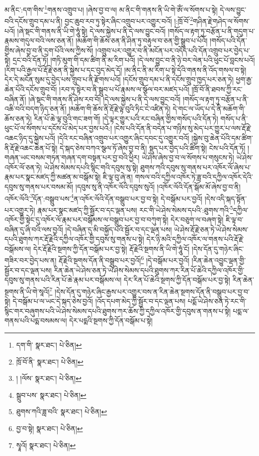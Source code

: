 མ་ནིང་:དག་གིས་\footnote{དག་གི་  སྣར་ཐང་།  པེ་ཅིན། }གནས་འགྲུབ་པ། །ཞེས་བྱ་བ་ལ། མ་ནིང་གི་གནས་ནི་ཡི་གེ་ཨོཾ་ལ་སོགས་པ་སྟེ། དེ་ལས་བྱུང་བའི་དངོས་གྲུབ་དམ་པ་ནི། བྱང་ཆུབ་རབ་ཏུ་སྟེར་ཞིང་འགྲུབ་པར་འགྱུར་བའོ། །:ཁྲོ་བོ་\footnote{ཁྲོ་བོ་ནི་  སྣར་ཐང་།  པེ་ཅིན། }གཤིན་རྗེ་གཤེད་ལ་སོགས་པའོ། །ཞེ་སྡང་གི་གནས་ནི་ཡི་གེ་ཧཱུཾ་སྟེ། དེ་ལས་སྐྱེས་པ་ནི་དེ་ལས་བྱུང་བའོ། །གསོད་ལ་རྟག་ཏུ་བརྩོན་པ་ནི་གདུག་པ་རྣམས་གདུལ་བའི་ལས་ཅན་ནོ། །མཆོག་གི་ཆོས་ཅན་ནི་ཤིན་ཏུ་བརྟུལ་བ་ཅན་གྱི་སྒྲུབ་པ་པོའོ། །གསོད་པའི་དོན་གྱིས་ཞེས་བྱ་བ་ནི་དྲག་པོའི་ལས་ཀྱིས་སོ། །འགྲུབ་པར་འགྱུར་བ་ནི་མངོན་པར་འདོད་པའི་དོན་འགྲུབ་པར་བྱེད་པ་སྟེ། དྲང་བའི་དོན་ཏོ། །གཏི་མུག་གི་དམ་ཚིག་ནི་མ་རིག་པའོ། །དེ་ལས་བྱུང་བ་ནི་ཉེ་བར་ལེན་པའི་ཕུང་པོ་བླངས་པའོ། །རིག་པའི་རྒྱལ་པོ་རྡོ་རྗེ་ཅན་ནི་སྐྱེས་པ་དང་བུད་མེད་དོ། །མ་ནིང་ནི་མ་རིག་པ་སྟེ་དེའི་གནས་ནི་འོད་གསལ་བ་སྟེ། དེར་དེ་མངོན་སུམ་དུ་བྱེད་པས་གྲུབ་པ་ནི་རྫོགས་པའོ། །དངོས་གྲུབ་དམ་པ་ནི་དངོས་གྲུབ་ཁྱད་པར་ཅན་ཏེ། ཕྱག་རྒྱ་ཆེན་པོའི་དངོས་གྲུབ་བོ། །རབ་ཏུ་སྟེར་བ་ནི་སྒྲུབ་པ་པོ་རྣམས་ལ་སྩོལ་བར་མཛད་པའོ། །ཁྲོ་བོ་ནི་ཐབས་ཀྱི་རང་བཞིན་ནོ། །ཞེ་སྡང་གི་གནས་ནི་ཤེས་རབ་བོ། །དེ་ལས་སྐྱེས་པ་ནི་དེ་ལས་བྱུང་བའོ། །གསོད་ལ་རྟག་ཏུ་བརྩོན་པ་ནི་འཆི་བའི་བདག་ཉིད་ཅན་ནོ། །མཆོག་གི་ཆོས་ནི་རྡོ་རྗེ་ལྟ་བུའི་ཏིང་ངེ་འཛིན་ཏེ། དེ་གང་ལ་ཡོད་པ་དེ་ནི་མཆོག་གི་ཆོས་ཅན་ཏེ། རིན་པོ་ཆེ་ལྟ་བུའི་གང་ཟག་གོ། །དེ་ལྟར་གྱུར་པའི་རང་བཞིན་གྱིས་གསོད་པའི་དོན་ཏེ། གསོད་པ་ནི་ཕུང་པོ་ལ་སོགས་པ་དངོས་པོ་མེད་པར་བྱས་པའོ:། །ངེས་པའི་དོན་ནི་བདེན་པ་གཉིས་སུ་མེད་པར་གྱུར་པ་ལས་རྡོ་རྗེ་འཆང་ཉིད་དུ་སྐྱེས་པའོ། །དེའི་རང་བཞིན་འགྲུབ་པར་འགྱུར་ཞིང་དབང་དུ་འགྱུར་བའོ། །སྐྱེས་བུ་ཆེན་པོའི་དམ་ཚིག་ནི་རྡོ་རྗེ་འཆང་ཆེན་པོ་སྟེ། དེ་སྐད་ཅེས་བཀའ་སྩལ་ཏོ་ཞེས་བྱ་བ་ནི། སྡུད་པར་བྱེད་པའི་ཚིག་སྟེ། ངེས་པའི་དོན་ཏོ། །གཞན་ཡང་བསམ་གཏན་གཞན་དག་བསྟན་པར་བྱ་བའི་ཕྱིར། ཡེ་ཤེས་ཞེས་བྱ་བ་ལ་སོགས་པ་གསུངས་ཏེ། ཡེ་ཤེས་འཁོར་ལོ་ཅན་ཏེ། ཡེ་ཤེས་སེམས་དཔའི་སྙིང་གའི་དབུས་སུ་སྟེ། ཐུགས་ཀའི་དབུས་སུ་གནས་པར་འཁོར་ལོ་ཞེས་པ་རྣམ་པར་སྣང་མཛད་ཀྱི་མཚན་མ་བསྒོམ་སྟེ། ཇི་ལྟ་བུ་ཞེ་ན། གསལ་བའི་དཀྱིལ་འཁོར་ཏེ་ཟླ་བའི་དཀྱིལ་འཁོར་དེའི་དབུས་སུ་གནས་པར་བསམ་མོ། །དབུས་སུ་ནི་འཁོར་ལོའི་དབུས་སུའོ། །འཁོར་ལོའི་དོན་སྒོམ་མོ་ཞེས་བྱ་བ་ནི། འཁོར་ལོའི་\footnote{། །ལོས་  སྣར་ཐང་།  པེ་ཅིན། }དོན་:བསྒྲུབ་པས་\footnote{སྒྲུབ་པས་  སྣར་ཐང་།  པེ་ཅིན། }ན་འཁོར་ལོའི་དོན་བསྒྲུབ་པར་བྱ་བ་སྟེ། དེ་བསྒོམ་པར་བྱའོ། །དེས་འདི་སྐད་སྟོན་པར་འགྱུར་ཏེ། རྣམ་པར་སྣང་མཛད་ཀྱི་སྦྱོར་བ་དང་ལྡན་པས། རང་གི་ཡེ་ཤེས་སེམས་དཔའི་:ཐུགས་ཀའི་\footnote{ཐུགས་ཀའི་ཟླ་བའི་  སྣར་ཐང་།  པེ་ཅིན། }དཀྱིལ་འཁོར་གྱི་སྟེང་དུ་འཁོར་ལོ་རྣམ་པར་བསྒོམས་ལ་བསྒྲུབ་པར་བྱ་བ་བཀུག་སྟེ། དེར་བཅུག་ལ་བཞག་སྟེ། ཇི་ལྟ་བ་བཞིན་དུ་ཞི་བའི་ལས་བྱའོ། །དེ་བཞིན་དུ་མི་བསྐྱོད་པའི་སྦྱོར་བ་དང་ལྡན་པས། ཡེ་ཤེས་རྡོ་རྗེ་ཅན་ཏེ་ཡེ་ཤེས་སེམས་དཔའི་ཐུགས་ཀར་རྡོ་རྗེའི་དཀྱིལ་འཁོར་གྱི་དབུས་སུ་གནས་པ་སྟེ། དེར་ཉི་མའི་དཀྱིལ་འཁོར་ལ་གནས་པའི་རྡོ་རྗེ་བསྒོམས་ལ། དེར་རྡོ་རྗེའི་སྔགས་ཀྱི་དོན་བསྒོམ་པར་བྱ་སྟེ། རྡོ་རྗེའི་སྔགས་ནི་ཡི་གེ་ཧཱུཾ་ངོ། །དེས་དོན་དུ་གཉེར་ཞིང་གཟིར་བར་བྱེད་པས་ན། རྡོ་རྗེའི་སྔགས་དོན་ནི་བསྒྲུབ་པར་བྱའོ།\footnote{བྱ་བ་སྟེ།  སྣར་ཐང་།  པེ་ཅིན། } །དེ་བསྒོམ་པར་བྱའོ། །རིན་ཆེན་འབྱུང་ལྡན་གྱི་སྦྱོར་བ་དང་ལྡན་པས། རིན་ཆེན་ཡེ་ཤེས་ཅན་ཏེ་ཡེ་ཤེས་སེམས་དཔའི་ཐུགས་ཀར་རིན་པོ་ཆེའི་དཀྱིལ་འཁོར་གྱི་དབུས་སུ་གནས་པའི་རིན་པོ་ཆེ་རྣམ་པར་བསྒོམས་ལ། དེར་རིན་པོ་ཆེའི་སྔགས་ཀྱི་དོན་བསྒོམ་པར་བྱ་སྟེ། རིན་ཆེན་སྔགས་ནི་ཡི་གེ་སཱའོ།\footnote{སྭཱའོ།  སྣར་ཐང་།  པེ་ཅིན། } །དེས་དོན་དུ་གཉེར་ཞིང་རྒྱས་པར་འགྱུར་བས་ན་རིན་ཆེན་སྔགས་དོན་ནི་བསྒྲུབ་པར་བྱ་བ་སྟེ། དེ་བསྒོམ་པ་ལ་ཡང་དེ་སྐད་ཅེས་བྱའོ། །འོད་དཔག་མེད་ཀྱི་སྦྱོར་བ་དང་ལྡན་པས། པདྨོ་ཡེ་ཤེས་ཅན་ཏེ་རང་གི་སྙིང་གར་བཞུགས་པའི་ཡེ་ཤེས་སེམས་དཔའི་ཐུགས་ཀར་ཆོས་ཀྱི་དཀྱིལ་འཁོར་གྱི་དབུས་ན་གནས་པ་སྟེ། པདྨ་ལ་གནས་པའི་པདྨ་བསམས་ལ། དེར་པདྨའི་སྔགས་ཀྱི་དོན་བསྒོམ་པ་སྟེ། 